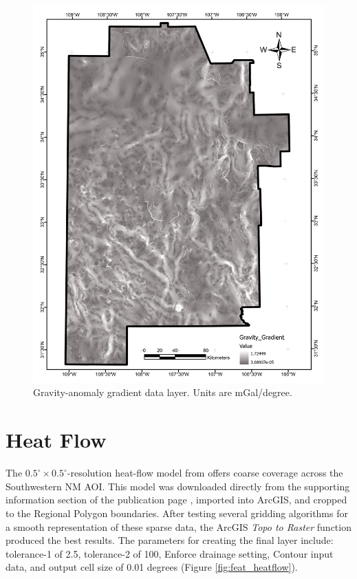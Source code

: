 \begin{figure}[H]
\centering
\includegraphics[width=0.75\linewidth]{templates/images/Figure-GravityGradient.pdf}
\caption[Gravity anomaly gradient data layer]{Gravity-anomaly gradient data layer. Units are mGal/degree.}
\label{fig:feat_gravity_gradient}
\end{figure}

\section{Heat Flow}\label{app:dl_heat_flow}

The \(0.5^\circ\times0.5^\circ\)-resolution heat-flow model from \citet{lucazeau_analysis_2019} offers coarse coverage across the Southwestern NM AOI. This model was downloaded directly from the supporting information section of the publication page \citep{lucazeau_analysis_2019}, imported into ArcGIS, and cropped to the Regional Polygon boundaries. After testing several gridding algorithms for a smooth representation of these sparse data, the ArcGIS \textit{Topo to Raster} function produced the best results. The parameters for creating the final layer include: tolerance-1 of 2.5, tolerance-2 of 100, Enforce drainage setting, Contour input data, and output cell size of 0.01 degrees (Figure \ref{fig:feat_heatflow}).

